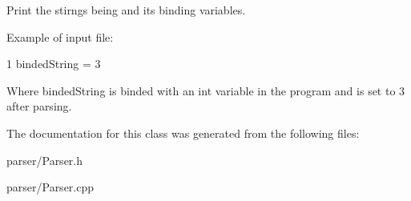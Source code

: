 Print the stirngs being and its binding variables. 

Example of input file\+: 
\begin{DoxyCode}
1 bindedString = 3
\end{DoxyCode}
 Where binded\+String is binded with an int variable in the program and is set to 3 after parsing. 

The documentation for this class was generated from the following files\+:\begin{DoxyCompactItemize}
\item 
parser/Parser.\+h\item 
parser/Parser.\+cpp\end{DoxyCompactItemize}
